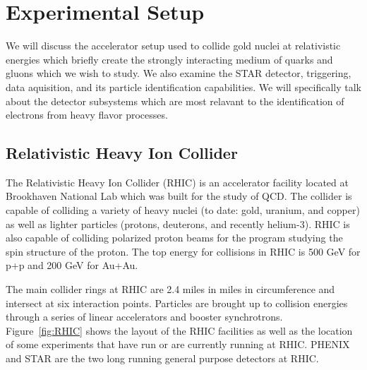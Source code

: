 \chapter{Experimental Setup}

We will discuss the accelerator setup used to collide gold nuclei at relativistic energies which briefly create the strongly interacting medium of quarks and gluons which we wish to study. We also examine the STAR detector, triggering, data aquisition, and its particle identification capabilities. We will specifically talk about the detector subsystems which are most relavant to the identification of electrons from heavy flavor processes. 

\section{Relativistic Heavy Ion Collider}

The Relativistic Heavy Ion Collider (RHIC) is an accelerator facility located at Brookhaven National Lab which was built for the study of QCD. The collider is capable of colliding a variety of heavy nuclei (to date: gold, uranium, and copper) as well as lighter particles (protons, deuterons, and recently helium-3). RHIC is also capable of colliding polarized proton beams for the program studying the spin structure of the proton. The top energy for collisions in RHIC is 500 GeV for p+p and 200 GeV for Au+Au. 

The main collider rings at RHIC are 2.4 miles in miles in circumference and intersect at six interaction points. Particles are brought up to collision energies through a series of linear accelerators and booster synchrotrons. Figure~\ref{fig:RHIC} shows the layout of the RHIC facilities as well as the location of some experiments that have run or are currently running at RHIC. PHENIX and STAR are the two long running general purpose detectors at RHIC.

